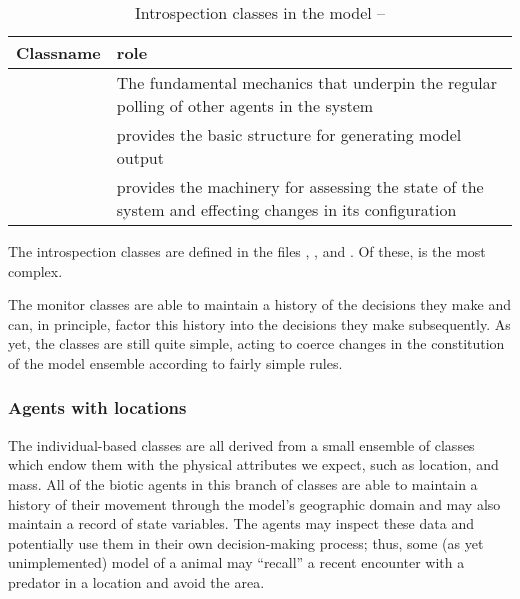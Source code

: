 \begin{table}[H]
\begin{center}
  \caption{Introspection classes in the model -- \label{classtableII}}
  \begin{tabular}{l L{7cm}}
    \toprule
    \textbf{Classname} & \textbf{role} \\
    \midrule
     & The fundamental mechanics that
      underpin the regular polling of other agents in the system\\
     & {provides the basic structure for generating model output}\\
     & {provides the machinery for assessing the state
      of the system and effecting changes in its configuration}\\
    \bottomrule
  \end{tabular}
\end{center}
\end{table}
The introspection classes are defined in the files
, , and
.  Of these,  is the
most complex.

The monitor classes are able to maintain a history of the decisions
they make and can, in principle, factor this history into the
decisions they make subsequently.  As yet, the \mmonitor classes are
still quite simple, acting to coerce changes in the constitution of
the model ensemble according to fairly simple rules.

\goodbreak
\subsubsection{Agents with locations}

The individual-based classes are all derived from a small ensemble of
classes which endow them with the physical attributes we expect, such
as location, and mass. All of the biotic agents in this branch of
classes are able to maintain a history of their movement through the
model's geographic domain and may also maintain a record of state
variables. The agents may inspect these data and potentially use them
in their own decision-making process; thus, some (as yet
unimplemented) model of a animal may ``recall'' a recent encounter
with a predator in a location and avoid the area.

